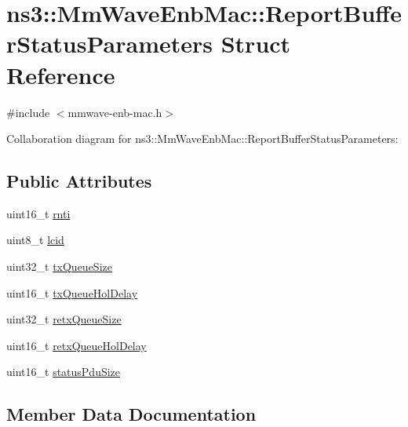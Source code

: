 \hypertarget{structns3_1_1MmWaveEnbMac_1_1ReportBufferStatusParameters}{}\section{ns3\+:\+:Mm\+Wave\+Enb\+Mac\+:\+:Report\+Buffer\+Status\+Parameters Struct Reference}
\label{structns3_1_1MmWaveEnbMac_1_1ReportBufferStatusParameters}


{\ttfamily \#include $<$mmwave-\/enb-\/mac.\+h$>$}



Collaboration diagram for ns3\+:\+:Mm\+Wave\+Enb\+Mac\+:\+:Report\+Buffer\+Status\+Parameters\+:
\subsection*{Public Attributes}
\begin{DoxyCompactItemize}
\item 
uint16\+\_\+t \hyperlink{structns3_1_1MmWaveEnbMac_1_1ReportBufferStatusParameters_a5927a28c52f0fe426b9584f3ca56b0f5}{rnti}
\item 
uint8\+\_\+t \hyperlink{structns3_1_1MmWaveEnbMac_1_1ReportBufferStatusParameters_a52668c7e5fb3cf84cd562b24f1ea0c7f}{lcid}
\item 
uint32\+\_\+t \hyperlink{structns3_1_1MmWaveEnbMac_1_1ReportBufferStatusParameters_a6a3de45fcc03ff69ecdb3479053780a1}{tx\+Queue\+Size}
\item 
uint16\+\_\+t \hyperlink{structns3_1_1MmWaveEnbMac_1_1ReportBufferStatusParameters_acf8ce07b4ab7f6e1556923f8390e63c8}{tx\+Queue\+Hol\+Delay}
\item 
uint32\+\_\+t \hyperlink{structns3_1_1MmWaveEnbMac_1_1ReportBufferStatusParameters_a7f1ceb103dfcb1b4178eee11109e4605}{retx\+Queue\+Size}
\item 
uint16\+\_\+t \hyperlink{structns3_1_1MmWaveEnbMac_1_1ReportBufferStatusParameters_a6cbd87b1fd07373cd641ee733a5e0483}{retx\+Queue\+Hol\+Delay}
\item 
uint16\+\_\+t \hyperlink{structns3_1_1MmWaveEnbMac_1_1ReportBufferStatusParameters_ab9fd70be6ef6419657d3a97fd8c65e3e}{status\+Pdu\+Size}
\end{DoxyCompactItemize}


\subsection{Member Data Documentation}
